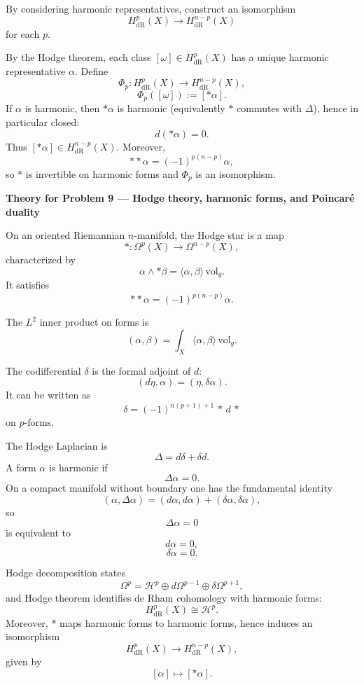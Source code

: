 \begin{problem}
\label{prob:cp-vii-0033}
By considering harmonic representatives, construct an isomorphism
\[
H^p_{\mathrm{dR}}(X)\to H^{n-p}_{\mathrm{dR}}(X)
\]
for each $p$.
\end{problem}

\begin{solution}
By the Hodge theorem, each class $[\omega]\in H^p_{\mathrm{dR}}(X)$ has a unique harmonic representative $\alpha$.
Define
\[
\Phi_p:H^p_{\mathrm{dR}}(X)\to H^{n-p}_{\mathrm{dR}}(X),
\]
\[
\Phi_p([\omega]):=[*\alpha].
\]
If $\alpha$ is harmonic, then $*\alpha$ is harmonic (equivalently $*$ commutes with $\Delta$), hence in particular closed:
\[
d(*\alpha)=0.
\]
Thus $[*\alpha]\in H^{n-p}_{\mathrm{dR}}(X)$.
Moreover,
\[
**\alpha=(-1)^{p(n-p)}\alpha,
\]
so $*$ is invertible on harmonic forms and $\Phi_p$ is an isomorphism.





\par\medskip\noindent\textbf{Theory for Problem 9 --- Hodge theory, harmonic forms, and Poincar\'e duality}\par\smallskip


On an oriented Riemannian $n$-manifold, the Hodge star is a map
\[
*:\Omega^p(X)\to\Omega^{n-p}(X),
\]
characterized by
\[
\alpha\wedge *\beta=\langle \alpha,\beta\rangle\,\mathrm{vol}_g.
\]
It satisfies
\[
**\alpha=(-1)^{p(n-p)}\alpha.
\]

The $L^2$ inner product on forms is
\[
(\alpha,\beta)=\int_X \langle \alpha,\beta\rangle\,\mathrm{vol}_g.
\]

The codifferential $\delta$ is the formal adjoint of $d$:
\[
(d\eta,\alpha)=(\eta,\delta\alpha).
\]
It can be written as
\[
\delta = (-1)^{n(p+1)+1}\,*\,d\,*
\]
on $p$-forms.

The Hodge Laplacian is
\[
\Delta=d\delta+\delta d.
\]
A form $\alpha$ is harmonic if
\[
\Delta\alpha=0.
\]
On a compact manifold without boundary one has the fundamental identity
\[
(\alpha,\Delta\alpha)=(d\alpha,d\alpha)+(\delta\alpha,\delta\alpha),
\]
so
\[
\Delta\alpha=0
\]
is equivalent to
\[
d\alpha=0,
\]
\[
\delta\alpha=0.
\]

Hodge decomposition states
\[
\Omega^p=\mathcal{H}^p\oplus d\Omega^{p-1}\oplus \delta\Omega^{p+1},
\]
and Hodge theorem identifies de Rham cohomology with harmonic forms:
\[
H^p_{\mathrm{dR}}(X)\cong \mathcal{H}^p.
\]
Moreover, $*$ maps harmonic forms to harmonic forms, hence induces an isomorphism
\[
H^p_{\mathrm{dR}}(X)\to H^{n-p}_{\mathrm{dR}}(X),
\]
given by
\[
[\alpha]\mapsto[*\alpha].
\]



\end{solution}
